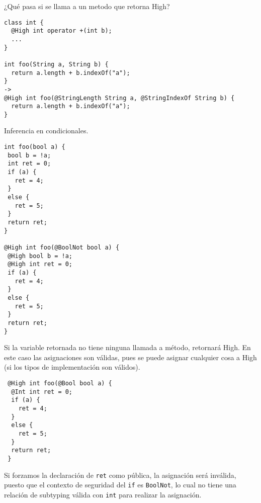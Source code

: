 ¿Qué pasa si se llama a un metodo que retorna High?

 \begin{lstlisting}
class int {
  @High int operator +(int b);
  ...
}

int foo(String a, String b) {
  return a.length + b.indexOf("a");
}
->
@High int foo(@StringLength String a, @StringIndexOf String b) {
  return a.length + b.indexOf("a");
}
 \end{lstlisting}

 Inferencia en condicionales.

 \begin{lstlisting}
int foo(bool a) {
 bool b = !a;
 int ret = 0;
 if (a) {
   ret = 4;
 }
 else {
   ret = 5;
 }
 return ret;
}

@High int foo(@BoolNot bool a) {
 @High bool b = !a;
 @High int ret = 0;
 if (a) {
   ret = 4;
 }
 else {
   ret = 5;
 }
 return ret;
}
 \end{lstlisting}

  Si la variable retornada no tiene ninguna llamada a método, retornará High. En este caso las asignaciones son válidas, pues se puede asignar cualquier cosa a High (si los tipos de implementación son válidos).

  \begin{lstlisting}
 @High int foo(@Bool bool a) {
  @Int int ret = 0;
  if (a) {
    ret = 4;
  }
  else {
    ret = 5;
  }
  return ret;
 }
  \end{lstlisting}

  Si forzamos la declaración de \texttt{ret} como pública, la asignación será inválida, puesto que el contexto de seguridad del \texttt{if} es \texttt{BoolNot}, lo cual no tiene una relación de subtyping válida con \texttt{int} para realizar la asignación.
